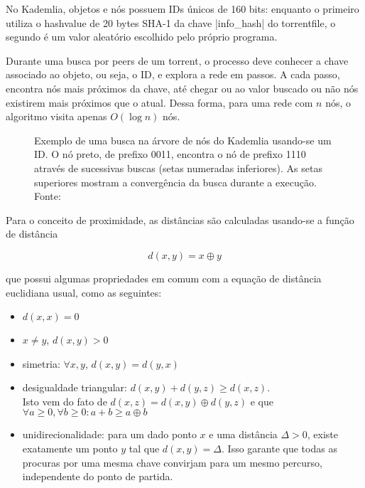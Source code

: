 No Kademlia, objetos e nós possuem IDs únicos de 160 bits: enquanto o primeiro utiliza
o \gls*{hashvalue} de 20 bytes SHA-1 da chave \bverb|info_hash| do \gls*{torrentfile},
o segundo é um valor aleatório escolhido pelo próprio programa.

Durante uma busca por \glspl*{peer} de um \gls*{torrent}, o processo deve conhecer a
chave associado ao objeto, ou seja, o ID, e explora a rede em passos. A cada passo,
encontra nós mais próximos da chave, até chegar ou ao valor buscado ou não nós
existirem mais próximos que o atual. Dessa forma, para uma rede com $n$ nós, o
algoritmo visita apenas $O(\log n)$ nós.

\begin{figure}[ht!]
    \centering
    \caption{Exemplo de uma busca na árvore de nós do Kademlia usando-se um ID. O nó
    preto, de prefixo 0011, encontra o nó de prefixo 1110 através de sucessivas buscas
    (setas numeradas inferiores). As setas superiores mostram a convergência da
    busca durante a execução. Fonte: \cite{artigo:kademlia}}
    \label{fig:dht-arvore-busca}
\end{figure}

Para o conceito de proximidade, as distâncias são calculadas usando-se a função de
distância

\begin{equation}
    d(x,y) = x \oplus y
\end{equation}

que possui algumas propriedades em comum com a equação de distância euclidiana usual,
como as seguintes:

\begin{itemize}
    \item $d(x,x) = 0$
    \item $x \neq y$, $d(x,y) > 0$
    \item simetria: $\forall x,y$, $d(x,y) = d(y,x)$
    \item desigualdade triangular: $d(x,y) + d(y,z) \geq d(x,z)$. \\
        Isto vem do fato de $d(x,z) = d(x,y) \oplus d(y,z)$ e que $\forall a \geq 0,
        \forall b \geq 0 : a + b \geq a \oplus b$
    \item unidirecionalidade: para um dado ponto $x$ e uma distância $\Delta > 0$,
        existe exatamente um ponto $y$ tal que $d(x,y) = \Delta$. Isso garante que todas
        as procuras por uma mesma chave convirjam para um mesmo percurso, independente
        do ponto de partida.
\end{itemize}

